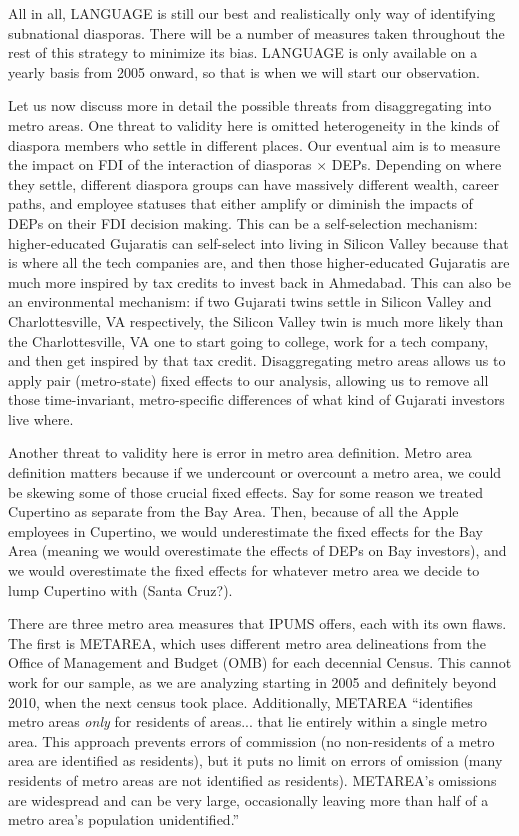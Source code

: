 \documentclass[12pt]{article}
\begin{document}
All in all, LANGUAGE is still our best and realistically only way of identifying subnational diasporas. There will be a number of measures taken throughout the rest of this strategy to minimize its bias. LANGUAGE is only available on a yearly basis from 2005 onward, so that is when we will start our observation.

Let us now discuss more in detail the possible threats from disaggregating into metro areas. One threat to validity here is omitted heterogeneity in the kinds of diaspora members who settle in different places. Our eventual aim is to measure the impact on FDI of the interaction of diasporas $\times$ DEPs. Depending on where they settle, different diaspora groups can have massively different wealth, career paths, and employee statuses that either amplify or diminish the impacts of DEPs on their FDI decision making. This can be a self-selection mechanism: higher-educated Gujaratis can self-select into living in Silicon Valley because that is where all the tech companies are, and then those higher-educated Gujaratis are much more inspired by tax credits to invest back in Ahmedabad. This can also be an environmental mechanism: if two Gujarati twins settle in Silicon Valley and Charlottesville, VA respectively, the Silicon Valley twin is much more likely than the Charlottesville, VA one to start going to college, work for a tech company, and then get inspired by that tax credit. Disaggregating metro areas allows us to apply pair (metro-state) fixed effects to our analysis, allowing us to remove all those time-invariant, metro-specific differences of what kind of Gujarati investors live where.

Another threat to validity here is error in metro area definition. Metro area definition matters because if we undercount or overcount a metro area, we could be skewing some of those crucial fixed effects. Say for some reason we treated Cupertino as separate from the Bay Area. Then, because of all the Apple employees in Cupertino, we would underestimate the fixed effects for the Bay Area (meaning we would overestimate the effects of DEPs on Bay investors), and we would overestimate the fixed effects for whatever metro area we decide to lump Cupertino with (Santa Cruz?). 

There are three metro area measures that IPUMS offers, each with its own flaws. \citep{noauthor_ipums_nodate} The first is METAREA, which uses different metro area delineations from the Office of Management and Budget (OMB) for each decennial Census. This cannot work for our sample, as we are analyzing starting in 2005 and definitely beyond 2010, when the next census took place. Additionally, METAREA ``identifies metro areas \textit{only} for residents of areas... that lie entirely within a single metro area. This approach prevents errors of commission (no non-residents of a metro area are identified as residents), but it puts no limit on errors of omission (many residents of metro areas are not identified as residents). METAREA's omissions are widespread and can be very large, occasionally leaving more than half of a metro area's population unidentified.'' 
\end{document}

